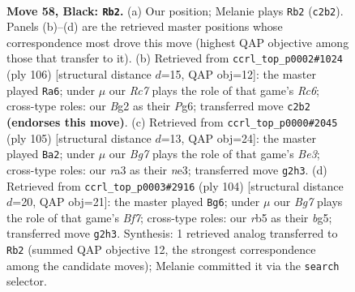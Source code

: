 \documentclass[11pt]{article}
\begin{document}
\clearpage

\begin{figure}[p]\centering
\begin{subfigure}{0.46\textwidth}\centering
\resizebox{\linewidth}{!}{%
\newchessgame
\chessboard[
  setfen={8/4kp2/6p1/1R6/1P5P/R7/2r3b1/6K1 b - - 2 58},
  showmover=false,
  pgfstyle=straightmove, color=movearrow, markmove={c2-b2}
]}
\caption{}
\end{subfigure}\hfill
\begin{subfigure}{0.46\textwidth}\centering
\resizebox{\linewidth}{!}{%
\newchessgame
\chessboard[
  setfen={8/8/2R3P1/7k/5p2/5P2/p5PK/r7 w - - 0 54},
  showmover=false,
  pgfstyle=straightmove, color=movearrow, markmove={c6-a6}
]}
\caption{}
\end{subfigure}
\\[4pt]
\begin{subfigure}{0.46\textwidth}\centering
\resizebox{\linewidth}{!}{%
\newchessgame
\chessboard[
  setfen={8/4K1pk/r3b2p/4P3/1R5P/4N3/8/8 b - - 10 53},
  showmover=false,
  pgfstyle=straightmove, color=movearrow, markmove={e6-a2}
]}
\caption{}
\end{subfigure}\hfill
\begin{subfigure}{0.46\textwidth}\centering
\resizebox{\linewidth}{!}{%
\newchessgame
\chessboard[
  setfen={5k2/R4B2/p6p/5Pb1/3r4/6KP/8/8 w - - 15 53},
  showmover=false,
  pgfstyle=straightmove, color=movearrow, markmove={f7-g6}
]}
\caption{}
\end{subfigure}
\caption{\textbf{Move 58, Black: \texttt{Rb2}.} (a) Our position; Melanie plays \texttt{Rb2} (\texttt{c2b2}). Panels (b)--(d) are the retrieved master positions whose correspondence most drove this move (highest QAP objective among those that transfer to it). (b) Retrieved from \texttt{ccrl\_top\_p0002\#1024} (ply 106) [structural distance $d$=15, QAP obj=12]: the master played \texttt{Ra6}; under $\mu$ our \emph{Rc7} plays the role of that game's \emph{Rc6}; cross-type roles: our \emph{B}g2 as their \emph{P}g6; transferred move \texttt{c2b2} \textbf{(endorses this move)}. (c) Retrieved from \texttt{ccrl\_top\_p0000\#2045} (ply 105) [structural distance $d$=13, QAP obj=24]: the master played \texttt{Ba2}; under $\mu$ our \emph{Bg7} plays the role of that game's \emph{Be3}; cross-type roles: our \emph{r}a3 as their \emph{n}e3; transferred move \texttt{g2h3}. (d) Retrieved from \texttt{ccrl\_top\_p0003\#2916} (ply 104) [structural distance $d$=20, QAP obj=21]: the master played \texttt{Bg6}; under $\mu$ our \emph{Bg7} plays the role of that game's \emph{Bf7}; cross-type roles: our \emph{r}b5 as their \emph{b}g5; transferred move \texttt{g2h3}. Synthesis: 1 retrieved analog transferred to \texttt{Rb2} (summed QAP objective 12, the strongest correspondence among the candidate moves); Melanie committed it via the \texttt{search} selector.}
\label{fig:thought-m115}
\end{figure}
\end{document}

